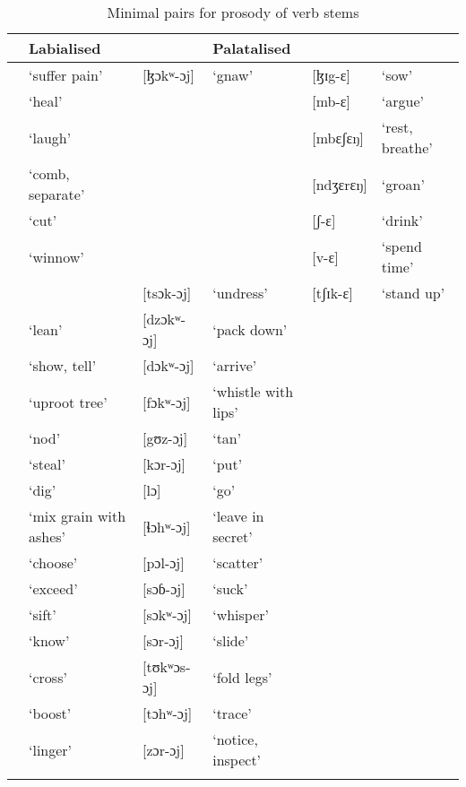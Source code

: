 \begin{sidewaystable}
\begin{tabular}{llllll}
\lsptoprule
\multicolumn{2}{l}{{Neutral}} & \multicolumn{2}{l}{{Labialised}} & \multicolumn{2}{l}{{Palatalised}}\\\midrule\relax
[ɮak-aj] & ‘suffer pain’ & [ɮɔkʷ{}-ɔj] & ‘gnaw’ & [ɮɪg-ɛ] & ‘sow’\\\relax
[mbar] & ‘heal’ &  &  & [mb-ɛ] & ‘argue’\\\relax
[mbas-aj] & ‘laugh’ &  &  & [mbɛʃɛŋ] & ‘rest, breathe’\\\relax
[nzar-aj] & ‘comb, separate’ &  &  & [ndʒɛrɛŋ] & ‘groan’\\\relax
[s-aj] & ‘cut’ &  &  & [ʃ{}-ɛ] & ‘drink’\\\relax
[v-aj] & ‘winnow’ &  &  & [v-ɛ] & ‘spend time’\\\relax
&  & [tsɔk-ɔj] & ‘undress’ & [tʃɪk-ɛ] & ‘stand up’\\\relax
[dzak-aj] & ‘lean’ & [dzɔkʷ{}-ɔj] & ‘pack down’ &  & \\\relax
[ɗak-aj] & ‘show, tell’ & [dɔkʷ{}-ɔj] & ‘arrive’ &  & \\\relax
[fak-aj] & ‘uproot tree’ & [fɔkʷ-ɔj] & ‘whistle with lips’ &  & \\\relax
[gaz-aj] & ‘nod’ & [gʊz-ɔj] & ‘tan’ &  & \\\relax
[kar-aj] & ‘steal’ & [kɔr-ɔj] & ‘put’ &  & \\\relax
[l-aj] & ‘dig’ & [lɔ] & ‘go’ &  & \\\relax
[ɬah-aj] & ‘mix grain with ashes’ & [ɬɔhʷ-ɔj] & ‘leave in secret’ &  & \\\relax
[pal-aj] & ‘choose’ & [pɔl-ɔj] & ‘scatter’ &  & \\\relax
[saɓ-aj] & ‘exceed’ & [sɔɓ-ɔj] & ‘suck’ &  & \\\relax
[sak-aj] & ‘sift’ & [sɔkʷ-ɔj] & ‘whisper’ &  & \\\relax
[sar] & ‘know’ & [sɔr-ɔj] & ‘slide’ &  & \\\relax
[təkas-aj] & ‘cross’ & [tʊkʷɔs-ɔj] & ‘fold legs’ &  & \\\relax
[tah-aj] & ‘boost’ & [tɔhʷ-ɔj] & ‘trace’ &  & \\\relax
[zar-aj] & ‘linger’ & [zɔr-ɔj] & ‘notice, inspect’ &  & \\
\lspbottomrule
\end{tabular}
\caption{Minimal pairs for prosody of verb stems\label{tab:43}}
\end{sidewaystable}

